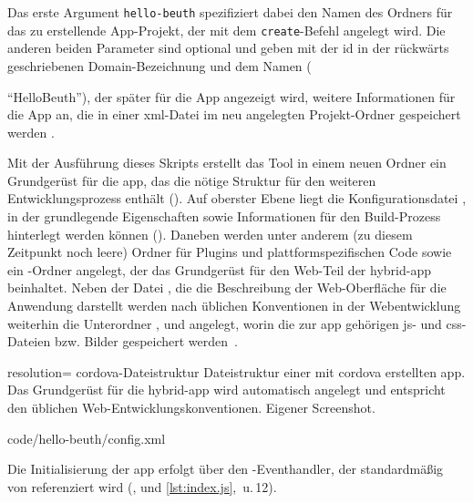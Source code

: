 Das erste Argument \lstinline|hello-beuth| spezifiziert dabei den Namen des Ordners für das zu erstellende App-Projekt, der mit dem \lstinline|create|-Befehl angelegt wird.
Die anderen beiden Parameter sind optional und geben mit der \gls{id} in der rückwärts geschriebenen Domain-Bezeichnung und dem Namen ({\mbox{\enquote{HelloBeuth}}), der später für die App angezeigt wird, weitere Informationen für die App an, die in einer \gls{xml}-Datei im neu angelegten Projekt-Ordner gespeichert werden \cite{Cordova-Docs_CLI}.

Mit der Ausführung dieses Skripts erstellt das Tool in einem neuen Ordner ein Grundgerüst für die \gls{app}, das die nötige Struktur für den weiteren Entwicklungsprozess enthält ().
Auf oberster Ebene liegt die Konfigurationsdatei , in der grundlegende Eigenschaften sowie Informationen für den Build-Prozess hinterlegt werden können ().
Daneben werden unter anderem (zu diesem Zeitpunkt noch leere) Ordner für Plugins und plattformspezifischen Code sowie ein -Ordner angelegt, der das Grundgerüst für den Web-Teil der \gls{hybrid-app} beinhaltet.
Neben der Datei , die die Beschreibung der Web-Oberfläche für die Anwendung darstellt werden nach üblichen Konventionen in der Webentwicklung weiterhin die Unterordner ,  und  angelegt, worin die zur \gls{app} gehörigen \gls{js}- und \gls{css}-Dateien bzw. Bilder gespeichert werden~\cite{Cordova-Docs_CLI}.


	{resolution=\screenshotRes}
	{\gls{cordova}-Dateistruktur}
		{Dateistruktur einer mit \gls{cordova} erstellten \gls{app}. Das Grundgerüst für die \gls{hybrid-app} wird automatisch angelegt und entspricht den üblichen Web-Entwicklungskonventionen.}
	{Eigener Screenshot.}


	{code/hello-beuth/config.xml}

Die Initialisierung der \gls{app} erfolgt über den -Eventhandler, der standardmäßig von  referenziert wird (,  und \autoref{lst:index.js}, \,u.\,12).

}
